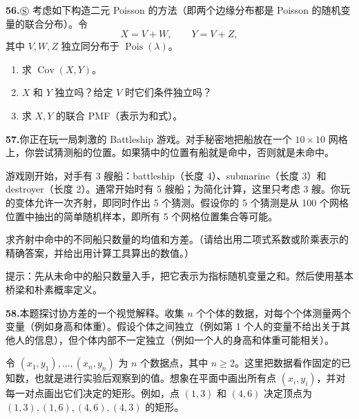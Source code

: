 \documentclass[UTF8,12pt,a4paper,fontset=fandol]{ctexart}
\begin{document}
\noindent\textbf{56.}\quad $\circledS$ 考虑如下构造二元 Poisson 的方法（即两个边缘分布都是 Poisson 的随机变量的联合分布）。令
\[
  X=V+W,\qquad Y=V+Z,
\]
其中 $V,W,Z$ 独立同分布于 $\operatorname{Pois}(\lambda)$。
\begin{enumerate}
  \item[(a)] 求 $\operatorname{Cov}(X,Y)$。
  \item[(b)] $X$ 和 $Y$ 独立吗？给定 $V$ 时它们条件独立吗？
  \item[(c)] 求 $X,Y$ 的联合 PMF（表示为和式）。
\end{enumerate}

\noindent\textbf{57.}\quad 你正在玩一局刺激的 Battleship 游戏。对手秘密地把船放在一个 $10\times 10$ 网格上，你尝试猜测船的位置。如果猜中的位置有船就是命中，否则就是未命中。

游戏刚开始，对手有 3 艘船：battleship（长度 4）、submarine（长度 3）和 destroyer（长度 2）。通常开始时有 5 艘船；为简化计算，这里只考虑 3 艘。你玩的变体允许一次齐射，即同时作出 5 个猜测。假设你的 5 个猜测是从 100 个网格位置中抽出的简单随机样本，即所有 5 个网格位置集合等可能。

求齐射中命中的不同船只数量的均值和方差。（请给出用二项式系数或阶乘表示的精确答案，并给出用计算工具算出的数值。）

提示：先从未命中的船只数量入手，把它表示为指标随机变量之和。然后使用基本桥梁和朴素概率定义。

\noindent\textbf{58.}\quad 本题探讨协方差的一个视觉解释。收集 $n$ 个个体的数据，对每个个体测量两个变量（例如身高和体重）。假设个体之间独立（例如第 1 个人的变量不给出关于其他人的信息），但个体内部不一定独立（例如一个人的身高和体重可能相关）。

令 $(x_1,y_1),\ldots,(x_n,y_n)$ 为 $n$ 个数据点，其中 $n\ge 2$。这里把数据看作固定的已知数，也就是进行实验后观察到的值。想象在平面中画出所有点 $(x_i,y_i)$，并对每一对点画出它们决定的矩形。例如，点 $(1,3)$ 和 $(4,6)$ 决定顶点为 $(1,3),(1,6),(4,6),(4,3)$ 的矩形。
\end{document}
